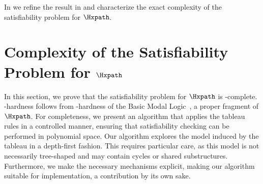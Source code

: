 \documentclass[10pt,a4paper]{amsart}
\theoremstyle{definition}
\theoremstyle{remark}
\begin{document}
In  we refine the result in  and characterize the exact complexity of the satisfiability problem for $\Hxpath$. 

\section{Complexity of the Satisfiability Problem for $\Hxpath$}
\label{sec:complexity}

In this section, we prove that the satisfiability problem for $\Hxpath$ is \pspace-complete.
\pspace-hardness follows from \pspace-hardness of the Basic Modal Logic~\cite{blackburn2001modal,blackburn06}, a proper fragment of $\Hxpath$.
For completeness, we present an algorithm that applies the tableau rules in a controlled manner, ensuring that satisfiability checking can be performed in polynomial space.
Our algorithm explores the model induced by the tableau in a depth-first fashion.
This requires particular care, as this model is not necessarily tree-shaped and may contain cycles or shared substructures.
Furthermore, we make the necessary mechanisms explicit, making our algorithm suitable for implementation, a contribution by its own sake.


\end{document}
